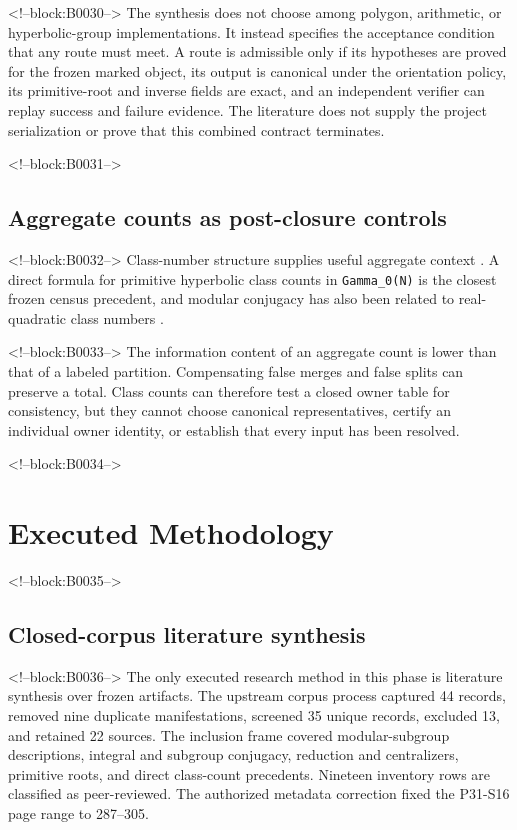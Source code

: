 \documentclass[11pt]{article}
\begin{document}
<!--block:B0030-->
The synthesis does not choose among polygon, arithmetic, or
hyperbolic-group implementations. It instead specifies the acceptance
condition that any route must meet. A route is admissible only if its
hypotheses are proved for the frozen marked object, its output is
canonical under the orientation policy, its primitive-root and inverse
fields are exact, and an independent verifier can replay success and
failure evidence. The literature does not supply the project
serialization or prove that this combined contract terminates.

<!--block:B0031-->
\hypertarget{24-aggregate-counts-as-post-closure-controls}{%
\subsection{Aggregate counts as post-closure
controls}\label{24-aggregate-counts-as-post-closure-controls}}

<!--block:B0032-->
Class-number structure supplies useful aggregate context
\citep{P31-S14}.
A direct formula for primitive hyperbolic class counts in
\texttt{Gamma\_0(N)} is the closest frozen census precedent, and modular
conjugacy has also been related to real-quadratic class numbers
\citep{P31-S21,P31-S22}.

<!--block:B0033-->
The information content of an aggregate count is lower than that of a
labeled partition. Compensating false merges and false splits can
preserve a total. Class counts can therefore test a closed owner table
for consistency, but they cannot choose canonical representatives,
certify an individual owner identity, or establish that every input has
been resolved.

<!--block:B0034-->
\hypertarget{3-executed-methodology}{%
\section{Executed Methodology}\label{3-executed-methodology}}

<!--block:B0035-->
\hypertarget{31-closed-corpus-literature-synthesis}{%
\subsection{Closed-corpus literature
synthesis}\label{31-closed-corpus-literature-synthesis}}

<!--block:B0036-->
The only executed research method in this phase is literature synthesis
over frozen artifacts. The upstream corpus process captured 44 records,
removed nine duplicate manifestations, screened 35 unique records,
excluded 13, and retained 22 sources. The inclusion frame covered
modular-subgroup descriptions, integral and subgroup conjugacy,
reduction and centralizers, primitive roots, and direct class-count
precedents. Nineteen inventory rows are classified as peer-reviewed. The
authorized metadata correction fixed the P31-S16 page range to 287--305.
\end{document}
